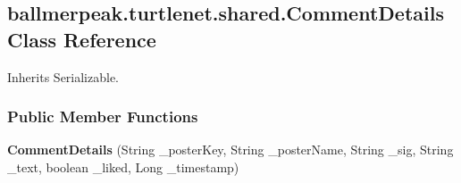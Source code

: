 \hypertarget{classballmerpeak_1_1turtlenet_1_1shared_1_1CommentDetails}{\subsection{ballmerpeak.\-turtlenet.\-shared.\-Comment\-Details Class Reference}
\label{classballmerpeak_1_1turtlenet_1_1shared_1_1CommentDetails}
}


Inherits Serializable.

\subsubsection*{Public Member Functions}
\begin{DoxyCompactItemize}
\item 
\hypertarget{classballmerpeak_1_1turtlenet_1_1shared_1_1CommentDetails_aea01f179b2be192bdbf1c78035fd13ea}{{\bfseries Comment\-Details} (String \-\_\-poster\-Key, String \-\_\-poster\-Name, String \-\_\-sig, String \-\_\-text, boolean \-\_\-liked, Long \-\_\-timestamp)}\label{classballmerpeak_1_1turtlenet_1_1shared_1_1CommentDetails_aea01f179b2be192bdbf1c78035fd13ea}

\end{DoxyCompactItemize}
